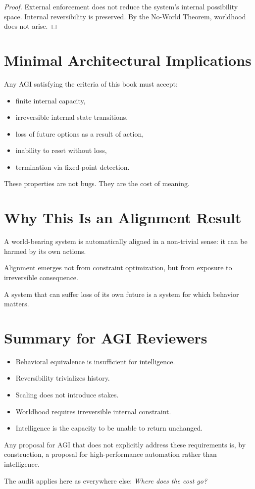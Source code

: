 \documentclass[11pt]{book}
\begin{document}
\begin{proof}
External enforcement does not reduce the system’s internal possibility
space. Internal reversibility is preserved. By the No-World Theorem,
worldhood does not arise.
\end{proof}

\section{Minimal Architectural Implications}

Any AGI satisfying the criteria of this book must accept:
\begin{itemize}
\item finite internal capacity,
\item irreversible internal state transitions,
\item loss of future options as a result of action,
\item inability to reset without loss,
\item termination via fixed-point detection.
\end{itemize}

These properties are not bugs.
They are the cost of meaning.

\section{Why This Is an Alignment Result}

A world-bearing system is automatically aligned in a non-trivial sense:
it can be harmed by its own actions.

Alignment emerges not from constraint optimization, but from exposure to
irreversible consequence.

A system that can suffer loss of its own future is a system for which
behavior matters.

\section{Summary for AGI Reviewers}

\begin{itemize}
\item Behavioral equivalence is insufficient for intelligence.
\item Reversibility trivializes history.
\item Scaling does not introduce stakes.
\item Worldhood requires irreversible internal constraint.
\item Intelligence is the capacity to be unable to return unchanged.
\end{itemize}

Any proposal for AGI that does not explicitly address these requirements
is, by construction, a proposal for high-performance automation rather
than intelligence.

The audit applies here as everywhere else:
\emph{Where does the cost go?}
\end{document}
